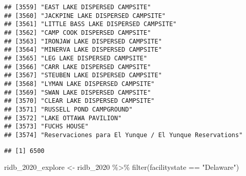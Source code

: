 \documentclass[
]{article}
\newenvironment{Shaded}{\begin{snugshade}}{\end{snugshade}}
\newcommand{\FunctionTok}[1]{\textcolor[rgb]{0.00,0.00,0.00}{#1}}
\newcommand{\NormalTok}[1]{#1}
\newcommand{\OtherTok}[1]{\textcolor[rgb]{0.56,0.35,0.01}{#1}}
\newcommand{\SpecialCharTok}[1]{\textcolor[rgb]{0.00,0.00,0.00}{#1}}
\newcommand{\StringTok}[1]{\textcolor[rgb]{0.31,0.60,0.02}{#1}}
\begin{document}
\begin{verbatim}
## [3559] "EAST LAKE DISPERSED CAMPSITE"                                                        
## [3560] "JACKPINE LAKE DISPERSED CAMPSITE"                                                    
## [3561] "LITTLE BASS LAKE DISPERSED CAMPSITE"                                                 
## [3562] "CAMP COOK DISPERSED CAMPSITE"                                                        
## [3563] "IRONJAW LAKE DISPERSED CAMPSITE"                                                     
## [3564] "MINERVA LAKE DISPERSED CAMPSITE"                                                     
## [3565] "LEG LAKE DISPERSED CAMPSITE"                                                         
## [3566] "CARR LAKE DISPERSED CAMPSITE"                                                        
## [3567] "STEUBEN LAKE DISPERSED CAMPSITE"                                                     
## [3568] "LYMAN LAKE DISPERSED CAMPSITE"                                                       
## [3569] "SWAN LAKE DISPERSED CAMPSITE"                                                        
## [3570] "CLEAR LAKE DISPERSED CAMPSITE"                                                       
## [3571] "RUSSELL POND CAMPGROUND"                                                             
## [3572] "LAKE OTTAWA PAVILION"                                                                
## [3573] "FUCHS HOUSE"                                                                         
## [3574] "Reservaciones para El Yunque / El Yunque Reservations"
\end{verbatim}

\begin{Shaded}
\end{Shaded}

\begin{verbatim}
## [1] 6500
\end{verbatim}

\begin{Shaded}
\begin{Highlighting}[]
\NormalTok{ridb\_2020\_explore }\OtherTok{\textless{}{-}}\NormalTok{ ridb\_2020 }\SpecialCharTok{\%\textgreater{}\%} 
  \FunctionTok{filter}\NormalTok{(facilitystate }\SpecialCharTok{==} \StringTok{"Delaware"}\NormalTok{)}
\end{Highlighting}
\end{Shaded}
\end{document}
